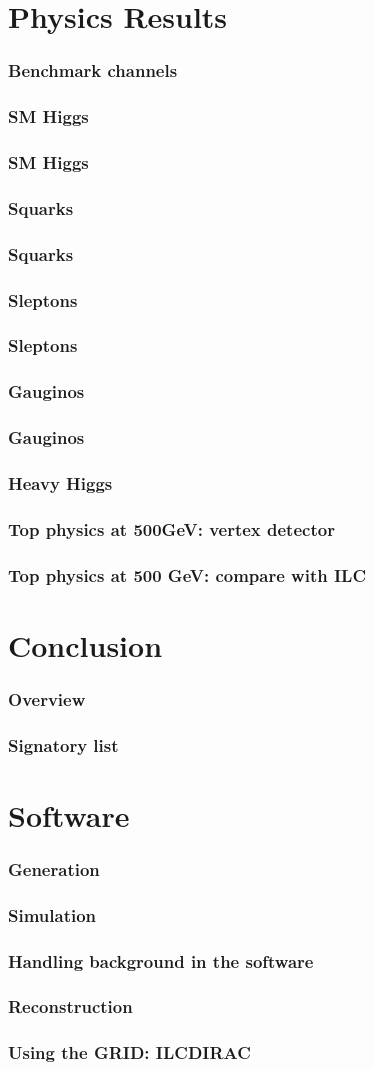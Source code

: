 \documentclass{beamer}
\begin{document}
\section{Physics Results}
\begin{frame}
 \frametitle{Benchmark channels}
\end{frame}
\begin{frame}
\frametitle{SM Higgs}
\end{frame}
\begin{frame}
\frametitle{SM Higgs}
\end{frame}
\begin{frame}
\frametitle{Squarks}
\end{frame}
\begin{frame}
\frametitle{Squarks}
\end{frame}
\begin{frame}
\frametitle{Sleptons}
\end{frame}
\begin{frame}
\frametitle{Sleptons}
\end{frame}
\begin{frame}
\frametitle{Gauginos}
\end{frame}
\begin{frame}
\frametitle{Gauginos}
\end{frame}
\begin{frame}
\frametitle{Heavy Higgs}
\end{frame}
\begin{frame}
\frametitle{Top physics at 500GeV: vertex detector}
\end{frame}
\begin{frame}
\frametitle{Top physics at 500 GeV: compare with ILC}
\end{frame}

\section{Conclusion}
\begin{frame}
\frametitle{Overview}
\end{frame}
\begin{frame}
\frametitle{Signatory list}
\end{frame}
\appendix

\section{Software}
\begin{frame}
\frametitle{Generation}
\end{frame}
\begin{frame}
\frametitle{Simulation}
\end{frame}
\begin{frame}
\frametitle{Handling background in the software}
\end{frame}
\begin{frame}
\frametitle{Reconstruction}
\end{frame}
\begin{frame}
\frametitle{Using the GRID: ILCDIRAC}
\end{frame}
\end{document}
